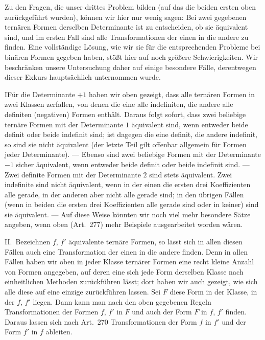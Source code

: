 Zu den Fragen, die unser drittes Problem bilden (auf das die beiden ersten
oben zurückgeführt wurden), können wir hier nur wenig sagen: Bei zwei
gegebenen ternären Formen derselben Determinante ist zu entscheiden,
ob sie äquivalent sind, und im ersten Fall sind alle Transformationen
der einen in die andere zu finden. Eine vollständige Lösung, wie wir sie
für die entsprechenden Probleme bei binären Formen gegeben haben, stößt
hier auf noch größere Schwierigkeiten.
Wir beschränken unsere Untersuchung daher auf einige besondere Fälle,
derentwegen dieser Exkurs hauptsächlich unternommen wurde.

I\quad Für die Determinante $+1$ haben wir oben gezeigt, dass alle
ternären Formen in zwei Klassen zerfallen, von denen die eine alle
indefiniten, die andere alle definiten (negativen) Formen enthält. Daraus
folgt sofort, dass zwei beliebige ternäre Formen mit der Determinante
$1$ äquivalent sind, wenn entweder beide definit oder beide indefinit
sind; ist dagegen die eine definit, die andere indefinit, so sind sie
nicht äquivalent (der letzte Teil gilt offenbar allgemein für Formen
jeder Determinante). --- Ebenso sind zwei beliebige Formen mit der
Determinante $-1$ sicher äquivalent, wenn entweder beide definit oder
beide indefinit sind. --- Zwei definite Formen mit der Determinante
$2$ sind stets äquivalent. Zwei indefinite sind nicht äquivalent,
wenn in der einen die ersten drei Koeffizienten alle gerade, in der
anderen aber nicht alle gerade sind; in den übrigen Fällen (wenn in
beiden die ersten drei Koeffizienten alle gerade sind oder in keiner)
sind sie äquivalent. --- Auf diese Weise könnten wir noch viel mehr
besondere Sätze angeben, wenn oben (Art.\ 277) mehr Beispiele ausgearbeitet
worden wären.

II.\ Bezeichnen $f$, $f'$ äquivalente ternäre Formen, so lässt sich
in allen diesen Fällen auch eine Transformation der einen in die andere
finden. Denn in allen Fällen haben wir oben in jeder Klasse ternärer
Formen eine recht kleine Anzahl von Formen angegeben, auf deren eine
sich jede Form derselben Klasse nach einheitlichen Methoden zurückführen
lässt; dort haben wir auch gezeigt, wie sich alle diese auf eine einzige
zurückführen lassen. Sei $F$ diese Form in der Klasse, in der $f$,
$f'$ liegen. Dann kann man nach den oben gegebenen Regeln Transformationen
der Formen $f$, $f'$ in $F$ und auch der Form $F$ in
$f$, $f'$ finden. Daraus lassen sich nach Art.\ 270 Transformationen
der Form $f$ in $f'$ und der Form $f'$ in $f$ ableiten.

